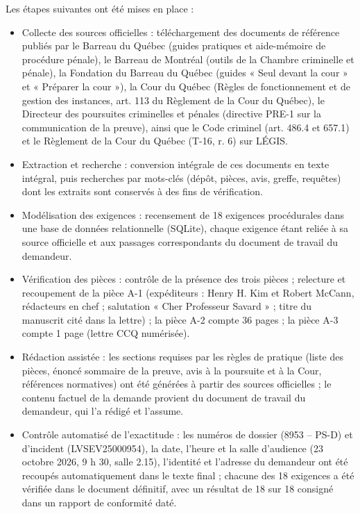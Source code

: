 \documentclass[12pt,a4paper]{article}
\begin{document}
Les étapes suivantes ont été mises en place :

\begin{itemize}
  \item Collecte des sources officielles : téléchargement des documents de référence publiés par le Barreau du Québec (guides pratiques et aide-mémoire de procédure pénale), le Barreau de Montréal (outils de la Chambre criminelle et pénale), la Fondation du Barreau du Québec (guides « Seul devant la cour » et « Préparer la cour »), la Cour du Québec (Règles de fonctionnement et de gestion des instances, art. 113 du Règlement de la Cour du Québec), le Directeur des poursuites criminelles et pénales (directive PRE-1 sur la communication de la preuve), ainsi que le Code criminel (art. 486.4 et 657.1) et le Règlement de la Cour du Québec (T-16, r. 6) sur LÉGIS.
  \item Extraction et recherche : conversion intégrale de ces documents en texte intégral, puis recherches par mots-clés (dépôt, pièces, avis, greffe, requêtes) dont les extraits sont conservés à des fins de vérification.
  \item Modélisation des exigences : recensement de 18 exigences procédurales dans une base de données relationnelle (SQLite), chaque exigence étant reliée à sa source officielle et aux passages correspondants du document de travail du demandeur.
  \item Vérification des pièces : contrôle de la présence des trois pièces ; relecture et recoupement de la pièce A-1 (expéditeurs : Henry H. Kim et Robert McCann, rédacteurs en chef ; salutation « Cher Professeur Savard » ; titre du manuscrit cité dans la lettre) ; la pièce A-2 compte 36 pages ; la pièce A-3 compte 1 page (lettre CCQ numérisée).
  \item Rédaction assistée : les sections requises par les règles de pratique (liste des pièces, énoncé sommaire de la preuve, avis à la poursuite et à la Cour, références normatives) ont été générées à partir des sources officielles ; le contenu factuel de la demande provient du document de travail du demandeur, qui l’a rédigé et l’assume.
  \item Contrôle automatisé de l’exactitude : les numéros de dossier (8953 – PS-D) et d’incident (LVSEV25000954), la date, l’heure et la salle d’audience (23 octobre 2026, 9 h 30, salle 2.15), l’identité et l’adresse du demandeur ont été recoupés automatiquement dans le texte final ; chacune des 18 exigences a été vérifiée dans le document définitif, avec un résultat de 18 sur 18 consigné dans un rapport de conformité daté.

\end{itemize}
\end{document}
